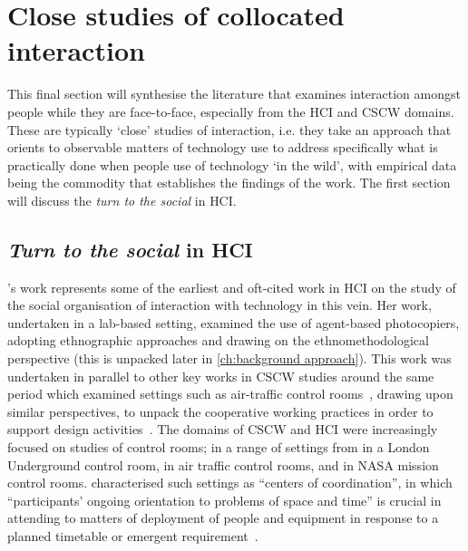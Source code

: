 \section{Close studies of collocated interaction}\label{sec:background litreview f2f}
\begin{revisedsubmission}
This final section will synthesise the literature that examines interaction amongst people while they are face-to-face, especially from the \ac{HCI} and \ac{CSCW} domains.
These are typically `close' studies of interaction, i.e. they take an approach that orients to observable matters of technology use to address specifically what is practically done when people use of technology `in the wild', with empirical data being the commodity that establishes the findings of the work.
The first section will discuss the \textit{turn to the social} in \ac{HCI}.






\subsection{\textit{Turn to the social} in HCI}\label{sec:background litreview f2f turn-to-the-social}
\citet{Suchman1985}'s work represents some of the earliest and oft-cited work in \ac{HCI} on the study of the social organisation of interaction with technology in this vein.
Her work, undertaken in a lab-based setting, examined the use of agent-based photocopiers, adopting ethnographic approaches and drawing on the ethnomethodological perspective (this is unpacked later in \autoref{ch:background approach}).
This work was undertaken in parallel to other key works in \ac{CSCW} studies around the same period which examined settings such as air-traffic control rooms~\citep{Bentley1992}, drawing upon similar perspectives, to unpack the cooperative working practices in order to support design activities~\citep{Bannon1993}.
The domains of \ac{CSCW} and \ac{HCI} were increasingly focused on studies of control rooms; in a range of settings from \citet{Heath1992} in a London Underground control room, \citet{Goodwin1996} in air traffic control rooms, and \citet{Watts1996} in NASA mission control rooms.
\citet{Suchman1997} characterised such settings as ``centers of coordination'', in which ``participants' ongoing orientation to problems of space and time'' is crucial in attending to matters of deployment of people and equipment in response to a planned timetable or emergent requirement~\citep[pp. 41--43]{Suchman1997}.


\end{revisedsubmission}
